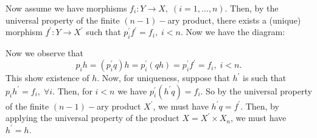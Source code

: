 Now assume we have morphisms $f_i:Y\to X,\;(i=1,\dots,n)$. Then, by the universal property of the finite 
$(n-1)-$ary product, there exists a (unique) morphism $f^\prime:Y\to X^\prime$ such that 
$p_i^\prime f^\prime = f_i,\; i<n$. Now we have the diagram:
\begin{center}
\end{center}
Now we observe that 
\begin{equation}
    p_ih=(p_i^\prime q)h=p_i^\prime(qh)=p_i^\prime f^\prime = f_i,\; i<n.
\end{equation}
This show existence of $h$. Now, for uniqueness, suppose that $h^\prime$ is such that 
$p_i h^\prime=f_i,\;\forall i$. Then, for $i<n$ we have $p_i^\prime(h^\prime q)=f_i$. So by the universal property of the 
finite $(n-1)-$ary product $X^\prime$, we must have $h^\prime q = f^\prime$. Then, by applying the universal 
property of the product $X=X^\prime\times X_n$, we must have $h^\prime = h$.

